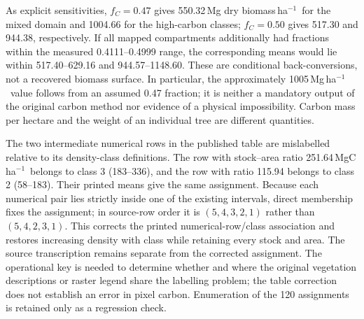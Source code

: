 \documentclass[11pt,a4paper]{article}
\theoremstyle{remark}
\begin{document}
As explicit sensitivities, $f_C=0.47$ gives 550.32\,Mg dry biomass\,ha$^{-1}$\ for the mixed domain and 1004.66 for the high-carbon classes; $f_C=0.50$ gives 517.30 and 944.38, respectively. If all mapped compartments additionally had fractions within the measured 0.4111--0.4999 range, the corresponding means would lie within 517.40--629.16 and 944.57--1148.60. These are conditional back-conversions, not a recovered biomass surface. In particular, the approximately 1005\,Mg\,ha$^{-1}$\ value follows from an assumed 0.47 fraction; it is neither a mandatory output of the original carbon method nor evidence of a physical impossibility. Carbon mass per hectare and the weight of an individual tree are different quantities.

\begin{table}[htbp]
\centering\small
\caption{Published-digit audit of the historical source's Table 3 \citep{Arellano2016}. Intervals, printed means and percentages are transcribed; the ratio column is $10^9C/A$. Carbon-density units are MgC\,ha$^{-1}$. Areas are shown in million hectares here, with the full two-decimal-hectare values in the repository. Classes 2 and 3 fit each other's intervals. The printed total is 723.97\,PgC.}
\label{tab:density}
\end{table}

The two intermediate numerical rows in the published table are mislabelled relative to its density-class definitions. The row with stock--area ratio 251.64\,MgC\,ha$^{-1}$\ belongs to class 3 (183--336), and the row with ratio 115.94 belongs to class 2 (58--183). Their printed means give the same assignment. Because each numerical pair lies strictly inside one of the existing intervals, direct membership fixes the assignment; in source-row order it is $(5,4,3,2,1)$ rather than $(5,4,2,3,1)$. This corrects the printed numerical-row/class association and restores increasing density with class while retaining every stock and area. The source transcription remains separate from the corrected assignment. The operational key is needed to determine whether and where the original vegetation descriptions or raster legend share the labelling problem; the table correction does not establish an error in pixel carbon. Enumeration of the 120 assignments is retained only as a regression check.
\end{document}

